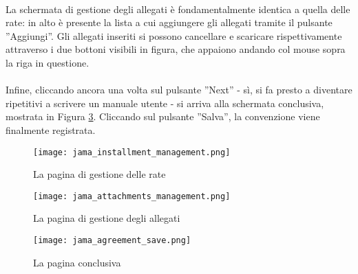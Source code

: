 \paragraph{}
La schermata di gestione degli allegati è fondamentalmente identica a quella delle rate: in alto è presente la lista a cui aggiungere gli allegati tramite il pulsante ''Aggiungi''.\newline
Gli allegati inseriti si possono cancellare e scaricare rispettivamente attraverso i due bottoni visibili in figura, che appaiono
andando col mouse sopra la riga in questione.
\paragraph{}
Infine, cliccando ancora una volta sul pulsante ''Next'' - sì, si fa presto a diventare ripetitivi a scrivere un manuale utente - si arriva alla schermata conclusiva, mostrata in Figura \ref{jama_agreement_save}. Cliccando sul pulsante ''Salva'', la convenzione viene finalmente registrata.

\begin{figure}
	\centering
	\texttt{[image: jama\_installment\_management.png]}
	\caption{La pagina di gestione delle rate}
	\label{jama_installment_management}
\end{figure}

\begin{figure}
	\centering
	\texttt{[image: jama\_attachments\_management.png]}
	\caption{La pagina di gestione degli allegati}
	\label{jama_attachments_management}
\end{figure}

\begin{figure}
	\centering
	\texttt{[image: jama\_agreement\_save.png]}
	\caption{La pagina conclusiva}
	\label{jama_agreement_save}
\end{figure}

